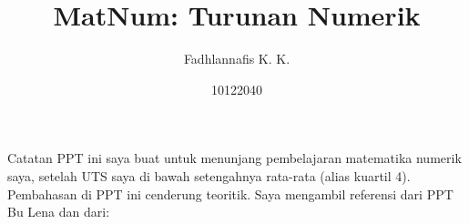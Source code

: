 \documentclass[xcolor={dvipsnames}, 9pt]{beamer}
\title{MatNum: Turunan Numerik}
\author{Fadhlannafis K. K.}
\date{10122040}
\begin{document}
	\begin{frame}[plain]
		\maketitle
	\end{frame}
	\begin{frame}{Catatan}
		PPT ini saya buat untuk menunjang pembelajaran matematika numerik saya, setelah UTS saya di bawah setengahnya rata-rata (alias kuartil 4). \newline
		Pembahasan di PPT ini cenderung teoritik. Saya mengambil referensi dari PPT Bu Lena dan dari:
		\nocite{*}
		\printbibliography
\end{frame}
\end{document}
